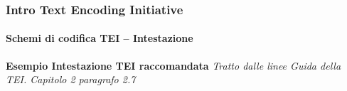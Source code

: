 \begin{frame}
	\frametitle{Intro Text Encoding Initiative}
	\framesubtitle{Schemi di codifica TEI – Intestazione}
	\addtocounter{nframe}{1}

        \textbf{Esempio Intestazione TEI raccomandata}
        \textit{Tratto dalle linee Guida della TEI. Capitolo 2 paragrafo 2.7}
        \\\url{}

\end{frame}

%

%

%

%

%
